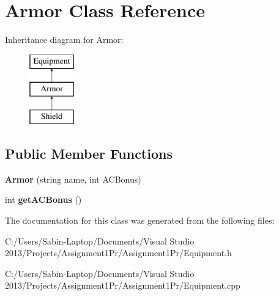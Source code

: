 \hypertarget{class_armor}{}\section{Armor Class Reference}
\label{class_armor}
Inheritance diagram for Armor\+:\begin{figure}[H]
\begin{center}
\leavevmode
\includegraphics[height=3.000000cm]{class_armor}
\end{center}
\end{figure}
\subsection*{Public Member Functions}
\begin{DoxyCompactItemize}
\item 
\hypertarget{class_armor_a3a8d526767fa5f92fecf3aafd0b97aa7}{}\label{class_armor_a3a8d526767fa5f92fecf3aafd0b97aa7} 
{\bfseries Armor} (string name, int A\+C\+Bonus)
\item 
\hypertarget{class_armor_a83b22277401061f1414a9178994a23c0}{}\label{class_armor_a83b22277401061f1414a9178994a23c0} 
int {\bfseries get\+A\+C\+Bonus} ()
\end{DoxyCompactItemize}


The documentation for this class was generated from the following files\+:\begin{DoxyCompactItemize}
\item 
C\+:/\+Users/\+Sabin-\/\+Laptop/\+Documents/\+Visual Studio 2013/\+Projects/\+Assignment1\+Pr/\+Assignment1\+Pr/Equipment.\+h\item 
C\+:/\+Users/\+Sabin-\/\+Laptop/\+Documents/\+Visual Studio 2013/\+Projects/\+Assignment1\+Pr/\+Assignment1\+Pr/Equipment.\+cpp\end{DoxyCompactItemize}
